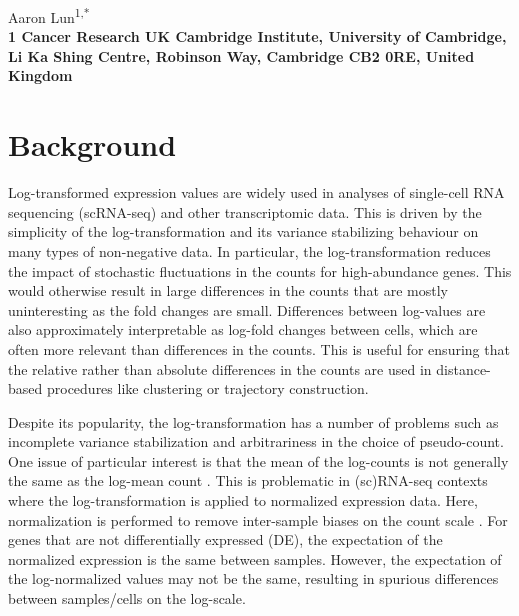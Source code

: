 \documentclass[10pt,letterpaper]{article}
\begin{document}
\vspace*{0.35in}

\begin{flushleft}
{\Large
    \textbf{}
}
\newline

Aaron Lun\textsuperscript{1,*}
\\
\bigskip
\bf{1} Cancer Research UK Cambridge Institute, University of Cambridge, Li Ka Shing Centre, Robinson Way, Cambridge CB2 0RE, United Kingdom \\
\bigskip

\end{flushleft}

\section{Background}
Log-transformed expression values are widely used in analyses of single-cell RNA sequencing (scRNA-seq) and other transcriptomic data.
This is driven by the simplicity of the log-transformation and its variance stabilizing behaviour on many types of non-negative data.
In particular, the log-transformation reduces the impact of stochastic fluctuations in the counts for high-abundance genes.
This would otherwise result in large differences in the counts that are mostly uninteresting as the fold changes are small.
Differences between log-values are also approximately interpretable as log-fold changes between cells, which are often more relevant than differences in the counts.
This is useful for ensuring that the relative rather than absolute differences in the counts are used in distance-based procedures like clustering or trajectory construction.

Despite its popularity, the log-transformation has a number of problems such as incomplete variance stabilization and arbitrariness in the choice of pseudo-count.
One issue of particular interest is that the mean of the log-counts is not generally the same as the log-mean count \cite{hicks2017missing}.
This is problematic in (sc)RNA-seq contexts where the log-transformation is applied to normalized expression data.
Here, normalization is performed to remove inter-sample biases on the count scale \cite{robinson2010scaling,lun2016pooling}.
For genes that are not differentially expressed (DE), the expectation of the normalized expression is the same between samples.
However, the expectation of the log-normalized values may not be the same, resulting in spurious differences between samples/cells on the log-scale.
\end{document}
